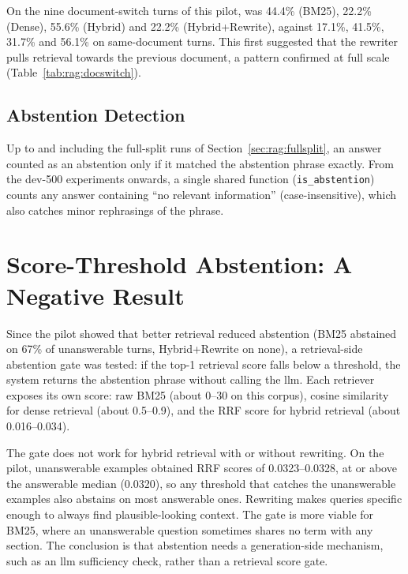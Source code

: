 On the nine document-switch turns of this pilot,  was 44.4\% (BM25),
22.2\% (Dense), 55.6\% (Hybrid) and 22.2\% (Hybrid+Rewrite), against 17.1\%,
41.5\%, 31.7\% and 56.1\% on same-document turns. This first suggested that the
rewriter pulls retrieval towards the previous document, a pattern confirmed at
full scale (Table~\ref{tab:rag:docswitch}).

\subsection{Abstention Detection}

Up to and including the full-split runs of Section~\ref{sec:rag:fullsplit}, an
answer counted as an abstention only if it matched the abstention phrase exactly.
From the dev-500 experiments onwards, a single shared function
(\texttt{is\_abstention}) counts any answer containing ``no relevant information''
(case-insensitive), which also catches minor rephrasings of the phrase.


\section{Score-Threshold Abstention: A Negative Result}\label{ax:log:threshold}

Since the pilot showed that better retrieval reduced abstention (BM25 abstained on
67\% of unanswerable turns, Hybrid+Rewrite on none), a retrieval-side abstention
gate was tested: if the top-1 retrieval score falls below a threshold, the system
returns the abstention phrase without calling the \gls{llm}. Each retriever exposes
its own score: raw BM25 (about 0--30 on this corpus), cosine similarity for dense
retrieval (about 0.5--0.9), and the RRF score for hybrid retrieval (about
0.016--0.034).

The gate does not work for hybrid retrieval with or without rewriting. On the pilot,
unanswerable examples obtained RRF scores of 0.0323--0.0328, at or above the
answerable median (0.0320), so any threshold that catches the unanswerable examples
also abstains on most answerable ones. Rewriting makes queries specific enough to
always find plausible-looking context. The gate is more viable for BM25, where an
unanswerable question sometimes shares no term with any section. The conclusion is that
abstention needs a generation-side mechanism, such as an \gls{llm} sufficiency check,
rather than a retrieval score gate.


